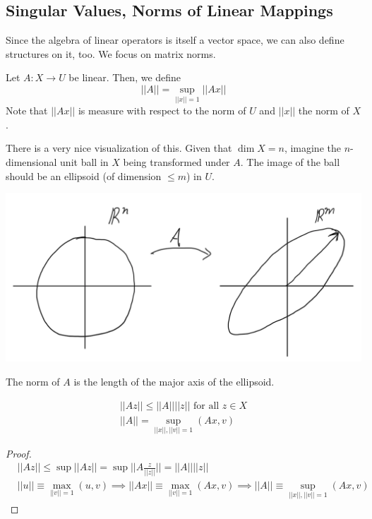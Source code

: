 \documentclass{article}
\begin{document}
  \subsection{Singular Values, Norms of Linear Mappings}

    Since the algebra of linear operators is itself a vector space, we can also define structures on it, too. We focus on matrix norms. 

    \begin{definition}
    Let $A: X \longrightarrow U$ be linear. Then, we define
    \[||A|| = \sup_{||x||=1} ||A x||\]
    Note that $||A x||$ is measure with respect to the norm of $U$ and $||x||$ the norm of $X$. 
    \end{definition}

    There is a very nice visualization of this. Given that $\dim{X}=n$, imagine the $n$-dimensional unit ball in $X$ being transformed under $A$. The image of the ball should be an ellipsoid (of dimension $\leq m$) in $U$. 
    \begin{center}
        \includegraphics[scale=0.4]{img/Matrix_Norm_Visualization.png}
    \end{center}
    The norm of $A$ is the length of the major axis of the ellipsoid. 

    \begin{theorem}
    \begin{align}
        ||A z|| \leq ||A|| ||z|| \text{ for all } z \in X \\
        ||A|| = \sup_{||x||, ||v|| = 1} (A x, v)
    \end{align}
    \end{theorem}
    \begin{proof}
    \begin{align*}
        &||A z|| \leq \sup{||A z||} = \sup{\Big|\Big| A \frac{z}{||z||} \Big|\Big|} = ||A|| ||z|| \\
        &||u|| \equiv \max_{||v||=1} (u, v) \implies ||A x|| \equiv \max_{||v||=1} (Ax, v) \implies ||A|| \equiv \sup_{||x||, ||v|| =1} (A x, v)
    \end{align*}
    \end{proof}
\end{document}

